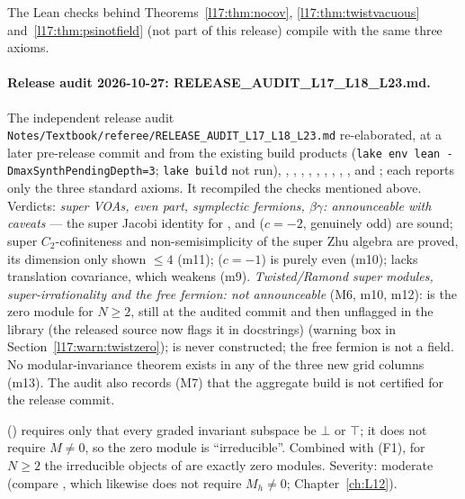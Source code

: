 The Lean checks behind Theorems~\ref{l17:thm:nocov}, \ref{l17:thm:twistvacuous} and~\ref{l17:thm:psinotfield}
(not part of this release) compile with the same three axioms.

\paragraph{Release audit 2026-10-27: RELEASE\_AUDIT\_L17\_L18\_L23.md.} The independent release audit
\texttt{Notes/\allowbreak Textbook/\allowbreak referee/\allowbreak RELEASE\_AUDIT\_L17\_L18\_L23.md} re-elaborated, at a later
pre-release commit and from the existing build products (\texttt{lake env lean -DmaxSynthPendingDepth=3}; \texttt{lake build}
not run), , , , ,
, , , ,
,  and ; each reports only the three standard
axioms. It recompiled the checks mentioned above. Verdicts: \emph{super VOAs, even part, symplectic fermions, $\beta\gamma$:
announceable with caveats} --- the super Jacobi identity for ,  and 
($c=-2$, genuinely odd) are sound; super $C_2$-cofiniteness and non-semisimplicity of the super Zhu algebra are proved, its
dimension only shown $\le4$ (m11);  ($c=-1$) is purely even (m10);  lacks translation
covariance, which weakens  (m9). \emph{Twisted/Ramond super modules, super-irrationality and the free fermion:
not announceable} (M6, m10, m12):  is the zero module for $N\ge2$, still at the audited commit and
then unflagged in the library (the released source now flags it in docstrings) (warning box in Section~\ref{l17:warn:twistzero});  is never
constructed; the free fermion is not a field. No modular-invariance theorem exists in any of the three new grid columns (m13).
The audit also records (M7) that the aggregate build is not certified for the release commit.

\begin{warning}[title={Further minor finding: irreducible twisted modules may be zero}]
 ()
requires only that every graded invariant subspace be $\bot$ or $\top$; it does not require $M\neq0$,
so the zero module is ``irreducible''. Combined with (F1), for $N\ge2$ the irreducible objects of
 are exactly zero modules. Severity: moderate (compare , which likewise does not require $M_h\neq0$;
Chapter~\ref{ch:L12}).
\end{warning}

